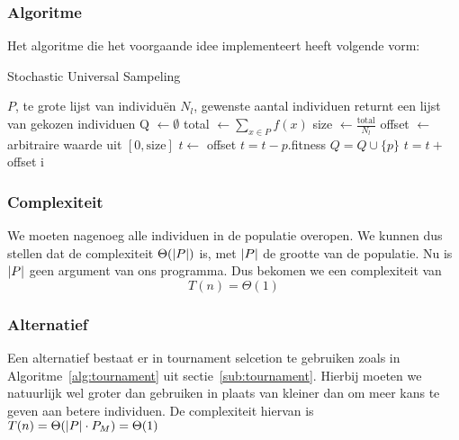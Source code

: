 \subsubsection{Algoritme}
Het algoritme die het voorgaande idee implementeert heeft volgende vorm:
	\begin{algorithm}[H]
	 	\caption{Stochastic Universal Sampeling}
		\begin{algorithmic}
		\Require 
			\State $P$, te grote lijst van individuën 
			\State $N_l$, gewenste aantal individuen
		\Ensure returnt een lijst van gekozen individuen
		\State Q $\gets \emptyset$
		\State total $\gets \sum_{x \in P} f(x)$ 
		\State size $\gets \frac{\text{total}}{N_l}$
		\State offset $\gets$ arbitraire waarde uit $\left\lbrack 0,\text{size} \right\rbrack$
		\State $t \gets$ offset
		\State $t = t-p.$fitness
			\State $Q = Q \cup \lbrace p \rbrace$
			\State $t = t+$offset
		\EndIf
		\EndFor		
		\State \Return i
		\EndFunction

		
		\end{algorithmic}
		\label{alg:SUS}
	\end{algorithm}		

\subsubsection{Complexiteit}
\label{ssub:SUSComplexity}
We moeten nagenoeg alle individuen in de populatie overopen. We kunnen dus stellen dat de complexiteit $ \Theta(\lvert P \rvert)$ is, met $\lvert P \rvert$ de grootte van de populatie. Nu is $\lvert P \rvert$ geen argument van ons programma. Dus bekomen we een complexiteit van \[T(n) = \Theta(1)\]

\subsubsection{Alternatief}
\label{sec:positiveTournament}
Een alternatief bestaat er in tournament selcetion te gebruiken zoals in Algoritme~\ref{alg:tournament} uit sectie~\ref{sub:tournament}. Hierbij moeten we natuurlijk wel groter dan gebruiken in plaats van kleiner dan om meer kans te geven aan betere individuen. De complexiteit hiervan is  $T(n) = \Theta(\lvert P \rvert \cdot P_M) = \Theta(1)$

%